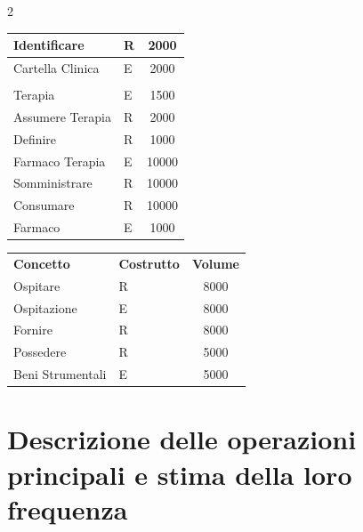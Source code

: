 \documentclass[a4paper, 12pt]{report}
\newenvironment{changemargin}[2]{%
  \begin{list}{}{%
    \setlength{\topsep}{0pt}%
    \setlength{\leftmargin}{#1}%
    \setlength{\rightmargin}{#2}%
    \setlength{\listparindent}{\parindent}%
    \setlength{\itemindent}{\parindent}%
    \setlength{\parsep}{\parskip}%
  }%
  \item[]}{\end{list}}
\begin{document}
\begin{changemargin}{-1cm}{-1cm}
\begin{multicols}{2}
\begin{tabularx}{8.5cm}{lXc}
                        \hline
                        Identificare & R & 2000 \\
                        \hline
                        Cartella Clinica & E & 2000 \\
                        \hline
                        \vspace{\baselineskip} \\
                        \hline
                        Terapia & E & 1500 \\
                        \hline
                        Assumere Terapia & R & 2000 \\
                        \hline
                        Definire & R & 1000 \\
                        \hline
                        Farmaco Terapia & E & 10000 \\
                        \hline
                        Somministrare & R & 10000 \\
                        \hline
                        Consumare & R & 10000 \\
                        \hline
                        Farmaco & E & 1000 \\
                        \hline
                \end{tabularx}

                \begin{tabularx}{8.5cm}{lXc}
                        \rowcolor{seaGreen}
                        \textbf{Concetto} & \textbf{Costrutto} & \textbf{Volume} \\
                        Ospitare & R & 8000 \\
                        \hline
                        Ospitazione & E & 8000 \\
                        \hline
                        Fornire & R & 8000 \\
                        \hline
                        Possedere & R & 5000 \\
                        \hline
                        Beni Strumentali & E & 5000 \\
                        \hline
                \end{tabularx}
        \end{multicols}
\end{changemargin}

\section{Descrizione delle operazioni principali e stima della loro frequenza}
\end{document}
